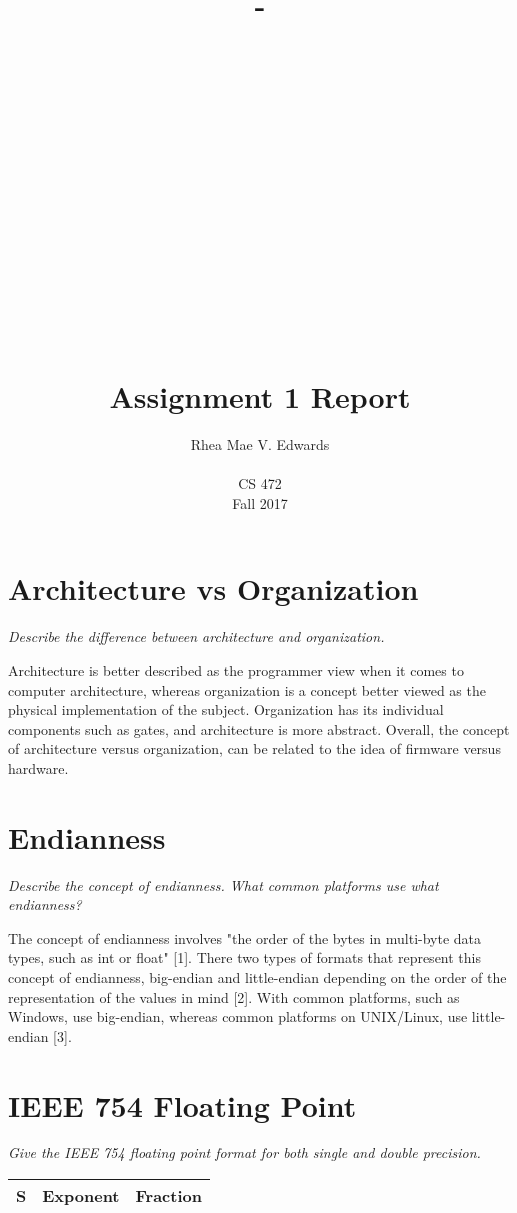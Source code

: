 \documentclass[letterpaper,10pt,onecolumn]{IEEEtran}
\title{-\\ ~ \\ ~ \\ ~ \\ ~ \\ ~ \\ ~ \\ ~ \\ ~ \\ ~ \\ Assignment 1 Report}
\author{Rhea Mae V. Edwards\\ ~ \\CS 472\\Fall 2017}
\begin{document}
\maketitle

\newpage

\section{\textbf{Architecture vs Organization}}

\noindent
\textit{Describe the difference between architecture and organization.}

\noindent
Architecture is better described as the programmer view when it comes to computer architecture, whereas organization is a concept better viewed as the physical implementation of the subject. Organization has its individual components such as gates, and architecture is more abstract. Overall, the concept of architecture versus organization, can be related to the idea of firmware versus hardware.

\section{\textbf{Endianness}}

\noindent
\textit{Describe the concept of endianness. What common platforms use what endianness?}

\noindent
The concept of endianness involves "the order of the bytes in multi-byte data types, such as int or float" [1]. There two types of formats that represent this concept of endianness, big-endian and little-endian depending on the order of the representation of the values in mind [2].
With common platforms, such as Windows, use big-endian, whereas common platforms on UNIX/Linux, use little-endian [3].

\section{\textbf{IEEE 754 Floating Point}}

\noindent
\textit{Give the IEEE 754 floating point format for both single and double precision.}

\noindent
\begin{tabular}{ |c|c|c| }
	\hline
	S & Exponent & Fraction \\
	\hline
\end{tabular} 
\end{document}
